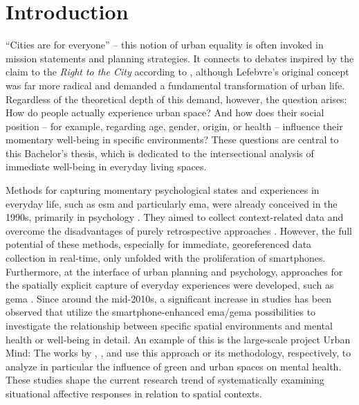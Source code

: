 \section{Introduction}
“Cities are for everyone” – this notion of urban equality is often invoked in mission statements and planning strategies. It connects to debates inspired by the claim to the \emph{Right to the City} according to \textcite{lefebvreDroitVille1967}, although Lefebvre's original concept was far more radical and demanded a fundamental transformation of urban life. Regardless of the theoretical depth of this demand, however, the question arises: How do people actually experience urban space? And how does their social position – for example, regarding age, gender, origin, or health – influence their momentary well-being in specific environments? These questions are central to this Bachelor's thesis, which is dedicated to the intersectional analysis of immediate well-being in everyday living spaces.

Methods for capturing momentary psychological states and experiences in everyday life, such as \gls{esm} and particularly \gls{ema}, were already conceived in the 1990s, primarily in psychology \parencite[cf.][]{stoneEcologicalMomentaryAssessment1994, shiffmanEcologicalMomentaryAssessment2008}. They aimed to collect context-related data and overcome the disadvantages of purely retrospective approaches \parencite{kahnemanDevelopmentsMeasurementSubjective2006}. However, the full potential of these methods, especially for immediate, georeferenced data collection in real-time, only unfolded with the proliferation of smartphones. Furthermore, at the interface of urban planning and psychology, approaches for the spatially explicit capture of everyday experiences were developed, such as \gls{gema} \parencite[cf.][]{kirchnerSpatiotemporalDeterminantsMental2016}. Since around the mid-2010s, a significant increase in studies has been observed that utilize the smartphone-enhanced \gls{ema}/\gls{gema} possibilities to investigate the relationship between specific spatial environments and mental health or well-being in detail. An example of this is the large-scale project Urban Mind: The works by \textcite{bakolisUrbanMindUsing2018}, \textcite{bergouMentalHealthBenefits2022}, and \textcite{hammoudSmartphonebasedEcologicalMomentary2024} use this approach or its methodology, respectively, to analyze in particular the influence of green and urban spaces on mental health. These studies shape the current research trend of systematically examining situational affective responses in relation to spatial contexts.

